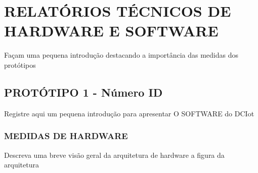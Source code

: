\chapter{RELATÓRIOS TÉCNICOS DE HARDWARE E SOFTWARE}
\label{cap:RELATÓRIOS TÉCNICOS DE HARDWARE E SOFTWARE}


Façam uma pequena introdução destacando a importância das medidas dos protótipos 

\section{PROTÓTIPO 1 - Número ID}
Registre aqui um pequena introdução para apresentar O SOFTWARE do DCIot


\subsection{MEDIDAS DE HARDWARE}
Descreva uma breve visão geral da arquitetura de hardware a figura da arquitetura



